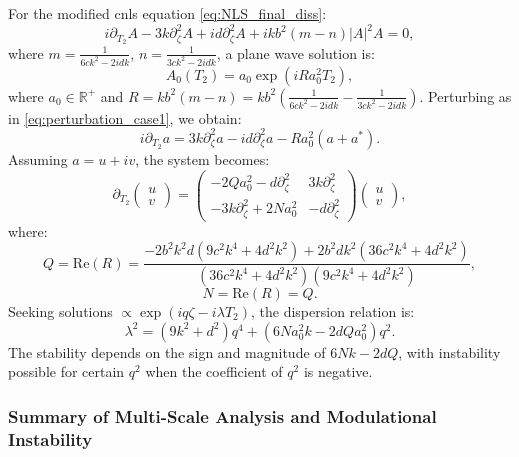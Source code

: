 \documentclass[alpha-refs, 12pt]{wiley-article}
\begin{document}
For the modified \acrshort{cnls} equation \eqref{eq:NLS_final_diss}:
\[
i \partial_{T_2} A - 3 k \partial_\zeta^2 A + i d \partial_\zeta^2 A + i k b^2 (m - n) |A|^2 A = 0,
\]
where $m = \frac{1}{6 c k^2 - 2 i d k}$, $n = \frac{1}{3 c k^2 - 2 i d k}$, a plane wave solution is:
\begin{equation}
\label{eq:plane_wave_case2}
A_0(T_2) = a_0 \exp(i R a_0^2 T_2),
\end{equation}
where $a_0 \in \mathbb{R}^+$ and $R = k b^2 (m - n) = k b^2 \left( \frac{1}{6 c k^2 - 2 i d k} - \frac{1}{3 c k^2 - 2 i d k} \right)$. Perturbing as in \eqref{eq:perturbation_case1}, we obtain:
\begin{equation}
\label{eq:linearized_case2}
i \partial_{T_2} a = 3 k \partial_\zeta^2 a - i d \partial_\zeta^2 a - R a_0^2 (a + a^*).
\end{equation}
Assuming $a = u + i v$, the system becomes:
\begin{equation}
\label{eq:matrix_case2}
\partial_{T_2} \begin{pmatrix} u \\ v \end{pmatrix} = \begin{pmatrix}
-2 Q a_0^2 - d \partial_\zeta^2 & 3 k \partial_\zeta^2 \\
-3 k \partial_\zeta^2 + 2 N a_0^2 & -d \partial_\zeta^2
\end{pmatrix} \begin{pmatrix} u \\ v \end{pmatrix},
\end{equation}
where:
\[
Q = \text{Re}(R) = \frac{-2 b^2 k^2 d (9 c^2 k^4 + 4 d^2 k^2) + 2 b^2 d k^2 (36 c^2 k^4 + 4 d^2 k^2)}{(36 c^2 k^4 + 4 d^2 k^2)(9 c^2 k^4 + 4 d^2 k^2)},
\]
\[
N = \text{Re}(R) = Q.
\]
Seeking solutions $\propto \exp(i q \zeta - i \lambda T_2)$, the dispersion relation is:
\begin{equation}
\label{eq:dispersion_case2}
\lambda^2 = (9 k^2 + d^2) q^4 + (6 N a_0^2 k - 2 d Q a_0^2) q^2.
\end{equation}
The stability depends on the sign and magnitude of $6 N k - 2 d Q$, with instability possible for certain $q^2$ when the coefficient of $q^2$ is negative.

\subsubsection*{Summary of Multi-Scale Analysis and Modulational Instability}
\end{document}
